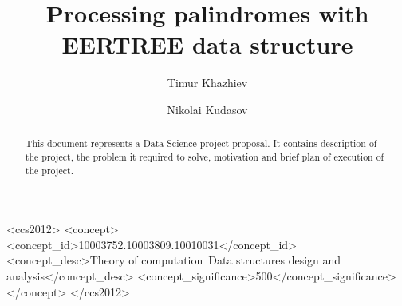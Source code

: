 \documentclass[sigconf]{acmart}
\begin{document}
\title{Processing palindromes with EERTREE data structure}


\author{Timur Khazhiev}

\author{Nikolai Kudasov}

\begin{abstract}
  This document represents a Data Science project proposal.
  It contains description of the project, the problem it required to solve,
  motivation and brief plan of execution of the project.
\end{abstract}

%
%
\begin{CCSXML}
<ccs2012>
<concept>
<concept_id>10003752.10003809.10010031</concept_id>
<concept_desc>Theory of computation~Data structures design and analysis</concept_desc>
<concept_significance>500</concept_significance>
</concept>
</ccs2012>
\end{CCSXML}



\maketitle





\end{document}
